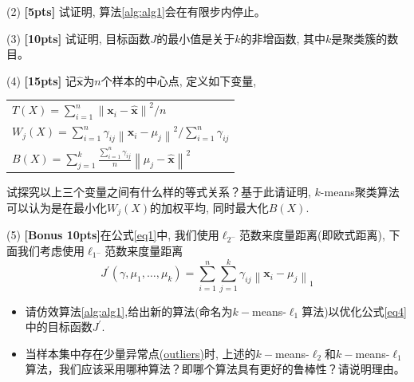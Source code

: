 \documentclass[a4paper,UTF8]{article}
\theoremstyle{definition}
\begin{document}
(2) \textbf{[5pts]} 试证明, 算法\ref{alg:alg1}会在有限步内停止。


(3) \textbf{[10pts]} 试证明, 目标函数$J$的最小值是关于$k$的非增函数, 其中$k$是聚类簇的数目。

(4) \textbf{[15pts]} 记$\hat{\mathbf{x}}$为$n$个样本的中心点, 定义如下变量,

\begin{table}[h]
	\centering
	\begin{tabular}{l}
		$T(X)=\sum_{i=1}^{n}\left\|\mathbf{x}_{i}-\hat{\mathbf{x}}\right\|^{2} / n$  \\
		$W_{j}(X)=\sum_{i=1}^{n} \gamma_{i j}\left\|\mathbf{x}_{i}-\mu_{j}\right\|^{2} / \sum_{i=1}^{n} \gamma_{i j}$  \\
		$B(X)=\sum_{j=1}^{k} \frac{\sum_{i=1}^{n} \gamma_{i j}}{n}\left\|\mu_{j}-\hat{\mathbf{x}}\right\|^{2}$  \\
	\end{tabular}
\end{table}

试探究以上三个变量之间有什么样的等式关系？基于此请证明, $k$-means聚类算法可以认为是在最小化$W_j(X)$的加权平均, 同时最大化$B(X)$.


(5) \textbf{[Bonus 10pts]}在公式\ref{eq1}中, 我们使用$\ell_{2^{-}}$范数来度量距离(即欧式距离), 下面我们考虑使用$\ell_{1^{-}}$范数来度量距离
\begin{equation}
\label{eq4}
J^{\prime}\left(\gamma, \mu_{1}, \ldots, \mu_{k}\right)=\sum_{i=1}^{n} \sum_{j=1}^{k} \gamma_{i j}\left\|\mathbf{x}_{i}-\mu_{j}\right\|_{1}
\end{equation}
\begin{itemize}
	\item 请仿效算法\ref{alg:alg1},给出新的算法(命名为$k-$means-$\ell_{1}$算法)以优化公式\ref{eq4}中的目标函数$J^{\prime}$. 
	\item 当样本集中存在少量异常点\href{https://en.wikipedia.org/wiki/Outlier}{(outliers)}时, 上述的$k-$means-$\ell_{2}$和$k-$means-$\ell_{1}$算法，我们应该采用哪种算法？即哪个算法具有更好的鲁棒性？请说明理由。
\end{itemize}
\end{document}
